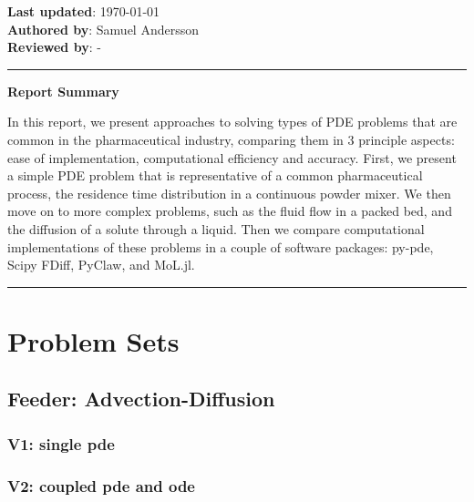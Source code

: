 \documentclass{article}
\begin{document}
\noindent
\textbf{Last updated}: \today\\
\textbf{Authored by}: Samuel Andersson\\
\textbf{Reviewed by}: -\\

\vspace{0.5cm}


\rule{\textwidth}{0.1pt}


\begin{center} \textbf{{\large Report Summary}} \end{center}

In this report, we present approaches to solving types of PDE problems that are common in the pharmaceutical industry, comparing them in 3 principle aspects: ease of implementation, computational efficiency and accuracy.
First, we present a simple PDE problem that is representative of a common pharmaceutical process, the residence time distribution in a continuous powder mixer. We then move on to more complex problems, such as the fluid flow in a packed bed, and the diffusion of a solute through a liquid.
Then we compare computational implementations of these problems in a couple of software packages: py-pde, Scipy FDiff, PyClaw, and MoL.jl.


\rule{\textwidth}{0.1pt}

\vspace{1cm}

{
    \vspace*{-1.3cm}
    \renewcommand\contentsname{}
    \addcontentsline{}{}{}

    \tableofcontents
}

\newpage{}

\section{Problem Sets}
\subsection{Feeder: Advection-Diffusion}
\subsubsection{V1: single pde}
\subsubsection{V2: coupled pde and ode}
\end{document}
